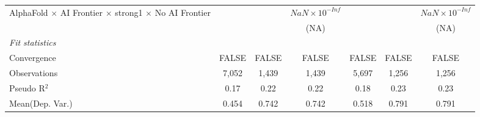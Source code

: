 \begin{tabular}{lcccccc}
   AlphaFold $\times$ AI Frontier $\times$ strong1 $\times$ No AI Frontier    &                        &                        & $NaN\times 10^{-Inf}$  &                        &                        & $NaN\times 10^{-Inf}$\\    
                                                                              &                        &                        & (NA)                   &                        &                        & (NA)\\   
   \midrule
   \emph{Fit statistics}\\
   Convergence                                                                &FALSE                   & FALSE                  & FALSE                  & FALSE                  & FALSE                  & FALSE\\  
   Observations                                                               & 7,052                  & 1,439                  & 1,439                  & 5,697                  & 1,256                  & 1,256\\  
   Pseudo R$^2$                                                               & 0.17                   & 0.22                   & 0.22                   & 0.18                   & 0.23                   & 0.23\\  
Mean(Dep. Var.) & 0.454 & 0.742 & 0.742 & 0.518 & 0.791 & 0.791 \\
   

\end{tabular}
